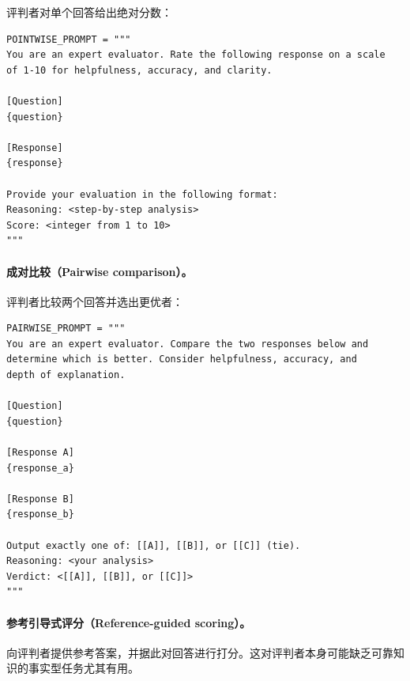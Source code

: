 评判者对单个回答给出绝对分数：

\begin{examplebox}
\begin{lstlisting}[style=pythonstyle]
POINTWISE_PROMPT = """
You are an expert evaluator. Rate the following response on a scale
of 1-10 for helpfulness, accuracy, and clarity.

[Question]
{question}

[Response]
{response}

Provide your evaluation in the following format:
Reasoning: <step-by-step analysis>
Score: <integer from 1 to 10>
"""
\end{lstlisting}
\end{examplebox}

\paragraph{成对比较（Pairwise comparison）。}
\label{pairwise-comparison.}

评判者比较两个回答并选出更优者：

\begin{examplebox}
\begin{lstlisting}[style=pythonstyle]
PAIRWISE_PROMPT = """
You are an expert evaluator. Compare the two responses below and
determine which is better. Consider helpfulness, accuracy, and
depth of explanation.

[Question]
{question}

[Response A]
{response_a}

[Response B]
{response_b}

Output exactly one of: [[A]], [[B]], or [[C]] (tie).
Reasoning: <your analysis>
Verdict: <[[A]], [[B]], or [[C]]>
"""
\end{lstlisting}
\end{examplebox}

\paragraph{参考引导式评分（Reference-guided scoring）。}
\label{reference-guided-scoring.}

向评判者提供参考答案，并据此对回答进行打分。这对评判者本身可能缺乏可靠知识的事实型任务尤其有用。

